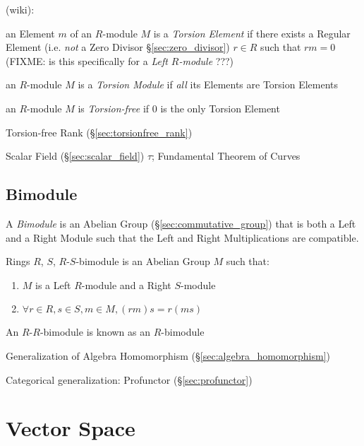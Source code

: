 (wiki):

an Element $m$ of an $R$-module $M$ is a \emph{Torsion Element} if there exists
a Regular Element (i.e. \emph{not} a Zero Divisor \S\ref{sec:zero_divisor})
$r \in R$ such that $r m = 0$
(FIXME: is this specifically for a \emph{Left $R$-module} ???)

an $R$-module $M$ is a \emph{Torsion Module} if \emph{all} its Elements are
Torsion Elements

an $R$-module $M$ is \emph{Torsion-free} if $0$ is the only Torsion Element

Torsion-free Rank (\S\ref{sec:torsionfree_rank})

Scalar Field (\S\ref{sec:scalar_field}) $\tau$; Fundamental Theorem of Curves



\subsection{Bimodule}\label{sec:bimodule}

A \emph{Bimodule} is an Abelian Group (\S\ref{sec:commutative_group}) that is
both a Left and a Right Module such that the Left and Right Multiplications are
compatible.

Rings $R$, $S$, $R$-$S$-bimodule is an Abelian Group $M$ such that:

\begin{enumerate}
\item $M$ is a Left $R$-module and a Right $S$-module
\item $\forall r \in R, s \in S, m \in M, (rm)s = r(ms)$
\end{enumerate}

An $R$-$R$-bimodule is known as an $R$-bimodule

Generalization of Algebra Homomorphism
(\S\ref{sec:algebra_homomorphism})

Categorical generalization: Profunctor (\S\ref{sec:profunctor})



\section{Vector Space}\label{sec:vector_space}

